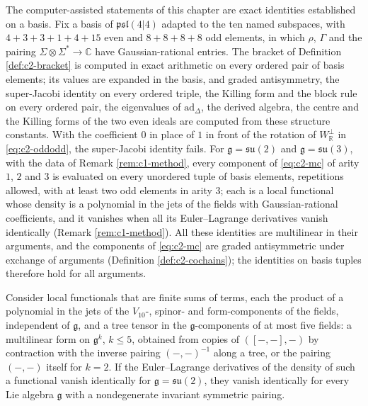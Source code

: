 \begin{remark}
\label{rem:c2-method}
The computer-assisted statements of this chapter are exact identities established on a basis. Fix a basis of $\mathfrak{psl}(4|4)$ adapted to the ten named subspaces, with $4+3+3+1+4+15$ even and $8+8+8+8$ odd elements, in which $\rho$, $\Gamma$ and the pairing $\Sigma\otimes\Sigma^*\to\mathbb C$ have Gaussian-rational entries. The bracket of Definition \ref{def:c2-bracket} is computed in exact arithmetic on every ordered pair of basis elements; its values are expanded in the basis, and graded antisymmetry, the super-Jacobi identity on every ordered triple, the Killing form and the block rule on every ordered pair, the eigenvalues of $\mathrm{ad}_\Delta$, the derived algebra, the centre and the Killing forms of the two even ideals are computed from these structure constants. With the coefficient $0$ in place of $1$ in front of the rotation of $W_{\mathbb R}^\perp$ in \eqref{eq:c2-oddodd}, the super-Jacobi identity fails. For $\mathfrak g=\mathfrak{su}(2)$ and $\mathfrak g=\mathfrak{su}(3)$, with the data of Remark \ref{rem:c1-method}, every component of \eqref{eq:c2-mc} of arity $1$, $2$ and $3$ is evaluated on every unordered tuple of basis elements, repetitions allowed, with at least two odd elements in arity $3$; each is a local functional whose density is a polynomial in the jets of the fields with Gaussian-rational coefficients, and it vanishes when all its Euler--Lagrange derivatives vanish identically (Remark \ref{rem:c1-method}). All these identities are multilinear in their arguments, and the components of \eqref{eq:c2-mc} are graded antisymmetric under exchange of arguments (Definition \ref{def:c2-cochains}); the identities on basis tuples therefore hold for all arguments.
\end{remark}

\begin{lemma}
\label{lem:c2-colour}
Consider local functionals that are finite sums of terms, each the product of a polynomial in the jets of the $V_{10}$-, spinor- and form-components of the fields, independent of $\mathfrak g$, and a tree tensor in the $\mathfrak g$-components of at most five fields: a multilinear form on $\mathfrak g^k$, $k\le5$, obtained from copies of $([-,-],-)$ by contraction with the inverse pairing $(-,-)^{-1}$ along a tree, or the pairing $(-,-)$ itself for $k=2$. If the Euler--Lagrange derivatives of the density of such a functional vanish identically for $\mathfrak g=\mathfrak{su}(2)$, they vanish identically for every Lie algebra $\mathfrak g$ with a nondegenerate invariant symmetric pairing.
\end{lemma}

